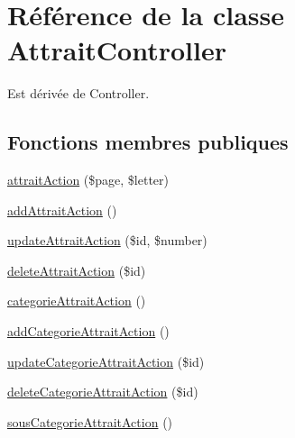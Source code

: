 \hypertarget{class_my_app_1_1_admin_bundle_1_1_controller_1_1_attrait_controller}{\section{Référence de la classe Attrait\-Controller}
\label{class_my_app_1_1_admin_bundle_1_1_controller_1_1_attrait_controller}
}


Est dérivée de Controller.

\subsection*{Fonctions membres publiques}
\begin{DoxyCompactItemize}
\item 
\hyperlink{class_my_app_1_1_admin_bundle_1_1_controller_1_1_attrait_controller_acebd0f1a794aae63e921fab4d21b7ea6}{attrait\-Action} (\$page, \$letter)
\item 
\hyperlink{class_my_app_1_1_admin_bundle_1_1_controller_1_1_attrait_controller_a81e39345548d8ff1837ddbc07dc273aa}{add\-Attrait\-Action} ()
\item 
\hyperlink{class_my_app_1_1_admin_bundle_1_1_controller_1_1_attrait_controller_ac47d53b58cf22bf3c29a2dab312f66da}{update\-Attrait\-Action} (\$id, \$number)
\item 
\hyperlink{class_my_app_1_1_admin_bundle_1_1_controller_1_1_attrait_controller_a6d6dd6708a293118ab3b93a309b5961a}{delete\-Attrait\-Action} (\$id)
\item 
\hyperlink{class_my_app_1_1_admin_bundle_1_1_controller_1_1_attrait_controller_a1837c144ade451be06037c1b08c66f36}{categorie\-Attrait\-Action} ()
\item 
\hyperlink{class_my_app_1_1_admin_bundle_1_1_controller_1_1_attrait_controller_ac24ab250ce35356ae13a3b959c2bdd6b}{add\-Categorie\-Attrait\-Action} ()
\item 
\hyperlink{class_my_app_1_1_admin_bundle_1_1_controller_1_1_attrait_controller_ac0f3c198f8430fb1f10712373937d9f8}{update\-Categorie\-Attrait\-Action} (\$id)
\item 
\hyperlink{class_my_app_1_1_admin_bundle_1_1_controller_1_1_attrait_controller_af4e971aeb3004df502fc543aaa88a4a9}{delete\-Categorie\-Attrait\-Action} (\$id)
\item 
\hyperlink{class_my_app_1_1_admin_bundle_1_1_controller_1_1_attrait_controller_a1e5a95c1c024ce4c757e204667d46878}{sous\-Categorie\-Attrait\-Action} ()
\item 

\end{DoxyCompactItemize}
